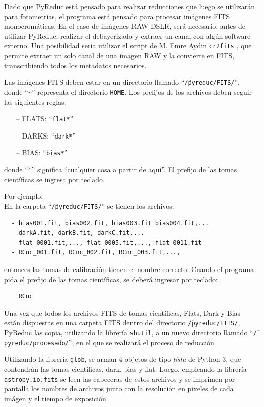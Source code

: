 \documentclass[a4paper, 12pt]{article}
\begin{document}
Dado que PyReduc está pensado para realizar reducciones que luego se utilizarán para fotometrías, el programa está pensado para procesar  imágenes FITS monocromáticas. En el caso de imágenes RAW DSLR, será necesario, antes de utilizar PyReduc, realizar el debayerizado y extraer un canal con algún software externo. Una posibilidad sería utilizar el script de M. Emre Aydin \texttt{cr2fits} \cite{aydin}, que permite extraer un solo canal de una imagen RAW y la convierte en FITS, transcribiendo todos los metadatos necesarios.

Las imágenes FITS deben estar en un directorio llamado ``\texttt{\~/pyreduc/FITS/}'',  donde ``\texttt{\~}'' representa el directorio \texttt{HOME}. Los prefijos de los archivos deben seguir las siguientes reglas:
\begin{itemize}
\item[--]  FLATS: ``\texttt{flat*}''
\item[--]  DARKS: ``\texttt{dark*}''
\item[--]  BIAS: ``\texttt{bias*}''
\end{itemize}
donde ``*'' significa ``cualquier cosa a partir de aquí''.
El prefijo de las tomas científicas se ingresa por teclado.

Por ejemplo:\\

 En la carpeta ``\texttt{\~/pyreduc/FITS/}'' se tienen los archivos:
\begin{verbatim}
  - bias001.fit, bias002.fit, bias003.fit bias004.fit,...
  - darkA.fit, darkB.fit, darkC.fit,...
  - flat_0001.fit,..., flat_0005.fit,..., flat_0011.fit
  - RCnc_001.fit, RCnc_002.fit, RCnc_003.fit,...,
\end{verbatim}
 entonces las tomas de calibración tienen el nombre correcto. Cuando el programa pida el prefijo de las tomas científicas,
se deberá ingresar por teclado:
\begin{verbatim}
	RCnc
\end{verbatim}





Una vez que todos los archivos FITS de tomas científicas, Flats, Dark y Bias están dispuestas en una carpeta FITS dentro del directorio \texttt{\~/pyreduc/FITS/}, PyReduc las copia, utilizando la librería \texttt{shutil}, a un nuevo directorio llamado ``\texttt{\~/pyreduc/procesado/}'', en el que se realizará el proceso de reducción.

Utilizando la librería \texttt{glob}, se arman 4 objetos de tipo {\em lista} de Python 3, que contendrán las tomas científicas, dark, bias y flat. Luego, empleando la librería {\tt astropy.io.fits} se leen las cabeceras de estos archivos y se imprimen por pantalla los nombres de archivos junto con la resolución en pixeles de cada imágen y el tiempo de exposición.
\end{document}

